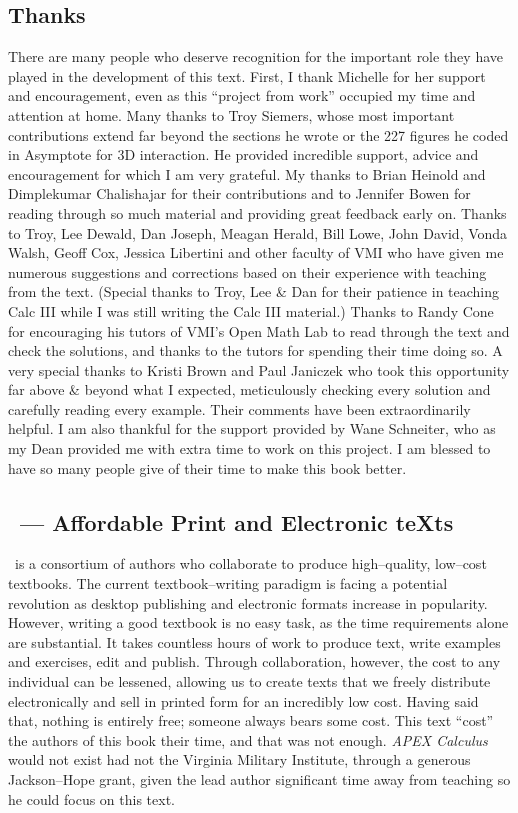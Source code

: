 \begin{itemize}
\begin{itemize}
\subsection*{Thanks}

There are many people who deserve recognition for the important role they have played in the development of this text. First, I thank Michelle for her support and encouragement, even as this ``project from work'' occupied my time and attention at home. Many thanks to Troy Siemers, whose most important contributions extend far beyond the sections he wrote or the 227 figures he coded in Asymptote for 3D interaction.  He provided incredible support, advice and encouragement for which I am very grateful. My thanks to Brian Heinold and Dimplekumar Chalishajar for their contributions and to Jennifer Bowen for reading through so much material and providing great feedback early on. Thanks to Troy, Lee Dewald, Dan Joseph, Meagan Herald, Bill Lowe, John David, Vonda Walsh, Geoff Cox, Jessica Libertini and other faculty of VMI who have given me numerous suggestions and corrections based on their experience with teaching from the text. (Special thanks to Troy, Lee \& Dan for their patience in teaching Calc III while I was still writing the Calc III material.) Thanks to Randy Cone for encouraging his tutors of VMI's Open Math Lab to read through the text and check the solutions, and thanks to the tutors for spending their time doing so. A very special thanks to Kristi Brown and Paul Janiczek who took this opportunity far above \& beyond what I expected, meticulously checking every solution and carefully reading every example. Their comments have been extraordinarily helpful. I am also thankful for the support provided by Wane Schneiter, who as my Dean provided me with extra time to work on this project. I am blessed to have so many people give of their time to make this book better.

\subsection*{\apex\ --- Affordable Print and Electronic teXts}

\apex\ is a consortium of authors  who collaborate to produce high--quality, low--cost textbooks. The current textbook--writing paradigm is facing a potential revolution as desktop publishing and electronic formats increase in popularity. However, writing a good textbook is no easy task, as the time requirements alone are substantial. It takes countless hours of work to produce text, write examples and exercises, edit and publish. Through collaboration, however, the cost to any individual can be lessened, allowing us to create texts that we freely distribute electronically and sell in printed form for an incredibly low cost. Having said that, nothing is entirely free; someone always bears some cost. This text ``cost'' the authors of this book their time, and that was not enough. \textit{APEX Calculus} would not exist had not the Virginia Military Institute, through a generous Jackson--Hope grant, given the lead author significant time away from teaching so he could focus on this text.


\end{itemize}
\end{itemize}
